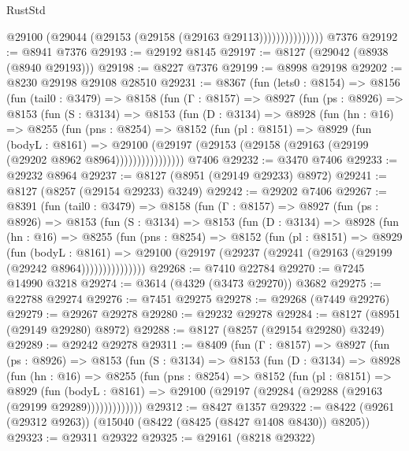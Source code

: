 \begin{lexlean}{RustStd}
\begin{coremodule}
                        @29100 (@29044 (@29153 (@29158 (@29163 @29113)))))))))))))))
    @7376
@29192 := @8941 @7376
@29193 := @29192 @8145
@29197 := @8127 (@29042 (@8938 (@8940 @29193)))
@29198 := @8227 @7376
@29199 := @8998 @29198
@29202 := @8230 @29198 @29108 @28510
@29231 := @8367
    (fun (lets0 : @8154) =>
    @8156
      (fun (tail0 : @3479) =>
      @8158
        (fun (Γ : @8157) =>
        @8927
          (fun (ps : @8926) =>
          @8153
            (fun (S : @3134) =>
            @8153
              (fun (D : @3134) =>
              @8928
                (fun (hn : @16) =>
                @8255
                  (fun (pns : @8254) =>
                  @8152
                    (fun (pl : @8151) =>
                    @8929
                      (fun (bodyL : @8161) =>
                      @29100
                        (@29197 (@29153 (@29158 (@29163 (@29199 (@29202 @8962 @8964))))))))))))))))
    @7406
@29232 := @3470 @7406
@29233 := @29232 @8964
@29237 := @8127 (@8951 (@29149 @29233) @8972)
@29241 := @8127 (@8257 (@29154 @29233) @3249)
@29242 := @29202 @7406
@29267 := @8391
    (fun (tail0 : @3479) =>
    @8158
      (fun (Γ : @8157) =>
      @8927
        (fun (ps : @8926) =>
        @8153
          (fun (S : @3134) =>
          @8153
            (fun (D : @3134) =>
            @8928
              (fun (hn : @16) =>
              @8255
                (fun (pns : @8254) =>
                @8152
                  (fun (pl : @8151) =>
                  @8929
                    (fun (bodyL : @8161) =>
                    @29100 (@29197 (@29237 (@29241 (@29163 (@29199 (@29242 @8964)))))))))))))))
@29268 := @7410 @22784
@29270 := @7245 @14990 @3218
@29274 := @3614 (@4329 (@3473 @29270)) @3682
@29275 := @22788 @29274
@29276 := @7451 @29275
@29278 := @29268 (@7449 @29276)
@29279 := @29267 @29278
@29280 := @29232 @29278
@29284 := @8127 (@8951 (@29149 @29280) @8972)
@29288 := @8127 (@8257 (@29154 @29280) @3249)
@29289 := @29242 @29278
@29311 := @8409
    (fun (Γ : @8157) =>
    @8927
      (fun (ps : @8926) =>
      @8153
        (fun (S : @3134) =>
        @8153
          (fun (D : @3134) =>
          @8928
            (fun (hn : @16) =>
            @8255
              (fun (pns : @8254) =>
              @8152
                (fun (pl : @8151) =>
                @8929
                  (fun (bodyL : @8161) =>
                  @29100 (@29197 (@29284 (@29288 (@29163 (@29199 @29289)))))))))))))
@29312 := @8427 @1357
@29322 := @8422 (@9261 (@29312 @9263)) (@15040 (@8422 (@8425 (@8427 @1408 @8430)) @8205))
@29323 := @29311 @29322
@29325 := @29161 (@8218 @29322)

\end{coremodule}
\end{lexlean}
